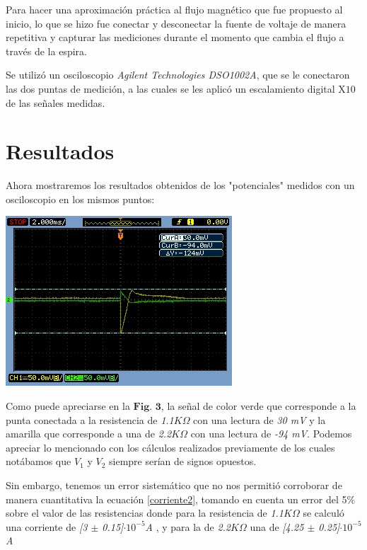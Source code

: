 \documentclass[a0,portrait]{a0poster}
\begin{document}
\begin{multicols}{2}
\vspace{0.3cm}
Para hacer una aproximación práctica al flujo magnético que fue propuesto al inicio, lo que se hizo fue conectar y desconectar la fuente de voltaje de manera repetitiva y capturar las mediciones durante el momento que cambia el flujo a través de la espira.

Se utilizó un osciloscopio \textit{Agilent Technologies DSO1002A}, que se le conectaron las dos puntas  de medición, a las cuales se les aplicó un escalamiento digital X$10$ de las señales medidas.
\section*{Resultados}
\noindent Ahora mostraremos los resultados obtenidos de los "potenciales" medidos con un osciloscopio en los mismos puntos:  
 
\begin{center}\vspace{0.4cm}
    \includegraphics[scale=1.5]{Circuito3.jpeg}
\end{center}\vspace{0.4cm}

\noindent Como puede apreciarse en la $\textbf{Fig. 3}$, la señal de color verde que corresponde a la punta conectada a la resistencia de \textit{1.1$ K\Omega$} con una lectura de \textit{30 mV} y la amarilla que corresponde a una de \textit{2.2$K \Omega$} con una lectura de \textit{-94 mV}. Podemos apreciar lo mencionado con los cálculos realizados previamente de los cuales notábamos que $V_{1}$ y $V_{2}$ siempre serían de signos opuestos.

Sin embargo, tenemos un error sistemático que no nos permitió corroborar de manera cuantitativa la ecuación \ref{corriente2}, tomando en cuenta un error del 5$\%$ sobre el valor de las resistencias donde para la resistencia de \textit{1.1$K \Omega$} se calculó una corriente de \textit{[3 $\pm$ 0.15]$\cdot 10^{-5}$A }, y para la de \textit{2.2$K \Omega$} una de \textit{[4.25 $\pm$ 0.25]$\cdot 10^{-5}$ A}


\end{multicols}
\end{document}
